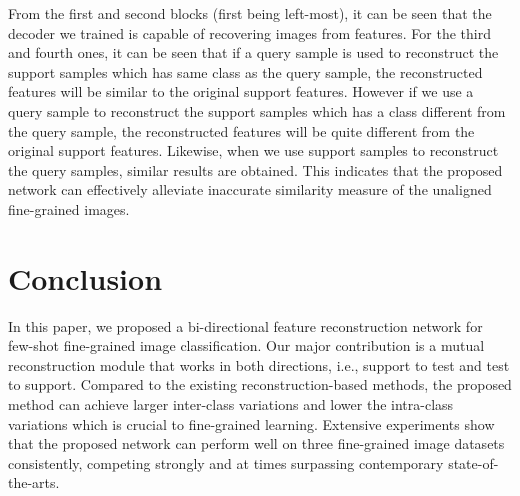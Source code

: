 \documentclass[letterpaper]{article} %
\begin{document}
From the first and second {blocks} (first being left-most), it can be seen that the decoder we trained is capable of recovering images from features. For the third {and fourth ones}, it can be seen that if  a query sample is used to reconstruct the support samples which has same class as the query sample, the reconstructed features will be similar to the original support features. However if we use a query sample to reconstruct the support samples which has a class different from the query sample, the reconstructed features will be quite different from the original support features. Likewise, when we use support samples to reconstruct the query samples, similar results are obtained. This indicates that the proposed network can effectively alleviate inaccurate similarity measure of the unaligned fine-grained images.


\section{Conclusion}
\label{Conclusion}
In this paper, we proposed a bi-directional feature reconstruction network for few-shot fine-grained image classification. Our major contribution is a mutual reconstruction module that works in both directions, i.e., support to test and test to support. Compared to the existing reconstruction-based methods, the proposed method can achieve larger inter-class variations and lower the intra-class variations which is crucial to fine-grained learning. 
Extensive experiments show that the proposed network can perform well on {three} fine-grained image datasets consistently, competing strongly and at times surpassing contemporary state-of-the-arts.




\end{document}
